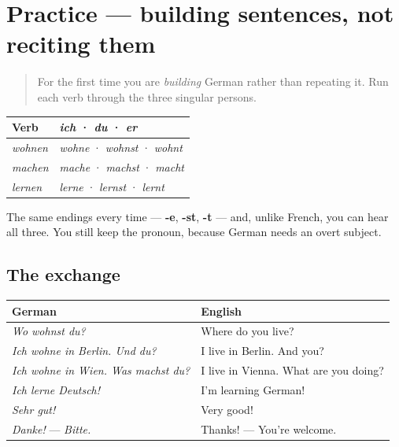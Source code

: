 \section[Practice]{Practice — building sentences, not reciting them}

\label{lesson:GE-C05-practice}



\begin{quote}
For the first time you are \emph{building} German rather than repeating it. Run each verb through the three singular persons.
\end{quote}

\begin{grammarlens}[title={Grammar Lens: three verbs, one pattern}]
\noindent
\begin{tabularx}{\linewidth}{@{}>{\raggedright\arraybackslash}X>{\raggedright\arraybackslash}X@{}}
\toprule
\textbf{Verb} & \textbf{\emph{ich} · \emph{du} · \emph{er}} \\
\midrule
\emph{wohnen} & \emph{wohne} · \emph{wohnst} · \emph{wohnt} \\
\emph{machen} & \emph{mache} · \emph{machst} · \emph{macht} \\
\emph{lernen} & \emph{lerne} · \emph{lernst} · \emph{lernt} \\
\bottomrule
\end{tabularx}

The same endings every time — \textbf{-e}, \textbf{-st}, \textbf{-t} — and, unlike French, you can hear all three. You still keep the pronoun, because German needs an overt subject.
\end{grammarlens}

\subsection*{The exchange}
\noindent
\begin{tabularx}{\linewidth}{@{}>{\raggedright\arraybackslash}X>{\raggedright\arraybackslash}X@{}}
\toprule
\textbf{German} & \textbf{English} \\
\midrule
\emph{Wo wohnst du?} & Where do you live? \\
\emph{Ich wohne in Berlin. Und du?} & I live in Berlin. And you? \\
\emph{Ich wohne in Wien. Was machst du?} & I live in Vienna. What are you doing? \\
\emph{Ich lerne Deutsch!} & I'm learning German! \\
\emph{Sehr gut!} & Very good! \\
\emph{Danke!} — \emph{Bitte.} & Thanks! — You're welcome. \\
\bottomrule
\end{tabularx}

